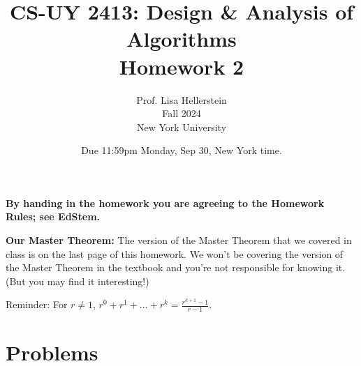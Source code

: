 \documentclass{article}
\begin{document}
\title{CS-UY 2413: Design \& Analysis of Algorithms \\ Homework 2}
\author{Prof. Lisa Hellerstein \\ Fall 2024 \\ New York University}
\date{Due 11:59pm Monday, Sep 30, New York time.}

\maketitle

\textbf{By handing in the homework you are agreeing to the Homework Rules; see EdStem.}

\textbf{Our Master Theorem:} The version of the Master Theorem that we covered in class is on the last page of this homework. We won’t be covering the version of the Master Theorem in the textbook and you’re not responsible for knowing it. (But you may find it interesting!)

Reminder: For $r \neq 1$, $r^0 + r^1 + \dots + r^k = \frac{r^{k+1}-1}{r-1}$.

\section*{Problems}
\end{document}
